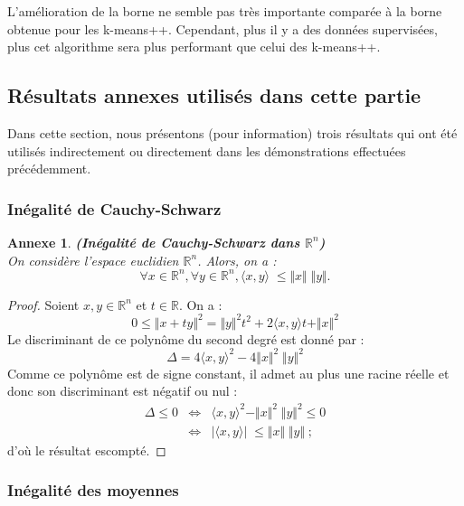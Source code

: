 \documentclass[12pt,a4paper]{book}
\newtheorem{annexe}{Annexe}
\newcommand{\R}{\mathbb{R}}
\newcommand{\1}{\mathds{1}}
\begin{document}
	L'amélioration de la borne ne semble pas très importante comparée à la borne obtenue pour les k-means++. Cependant, plus il y a des données supervisées, plus cet algorithme sera plus performant que celui des k-means++.
	

\subsection{Résultats annexes utilisés dans cette partie}

Dans cette section, nous présentons (pour information) trois résultats qui ont été utilisés indirectement ou directement dans les démonstrations effectuées précédemment.

\subsubsection{Inégalité de Cauchy-Schwarz}
	
	\begin{annexe} \label{cauchy-schwarz}
		\textbf{(Inégalité de Cauchy-Schwarz dans $\R^n$)}\\
		On considère l'espace euclidien $\R^n$. Alors, on a : 
		$$
			\forall x \in \R^n, \forall y \in \R^n, \langle x,y \rangle \; \leq \Vert x \Vert \; \Vert y \Vert.
		$$
	\end{annexe}
	
	\begin{proof}
		Soient $x,y \in \R^n$ et $t \in \R$. On a :
		$$
			0 \leq \Vert x+ty \Vert^2 = \Vert y \Vert^2 t^2 + 2 \langle x,y \rangle t + \Vert x \Vert^2
		$$
		Le discriminant de ce polynôme du second degré est donné par :
		$$
			\Delta = 4 \langle x,y \rangle^2 - 4 \Vert x \Vert^2 \; \Vert y \Vert^2
		$$
		Comme ce polynôme est de signe constant, il admet au plus une racine réelle et donc son discriminant est négatif ou nul : 
		\begin{eqnarray*}
		 \Delta \leq 0 & \Leftrightarrow & \langle x,y \rangle^2 - \Vert x \Vert^2 \; \Vert y \Vert^2 \leq 0 \\
		 & \Leftrightarrow & \vert \langle x,y \rangle \vert \; \leq \Vert x \Vert \; \Vert y \Vert \; ;
		\end{eqnarray*}
		 d'où le résultat escompté.
	\end{proof}	
	
\subsubsection{Inégalité des moyennes}
\end{document}
